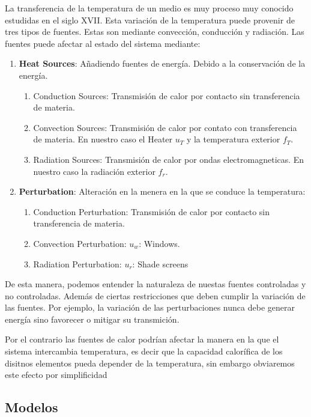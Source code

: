     La transferencia de la temperatura de un medio es muy proceso muy conocido estudidas en el siglo XVII. Esta variación de la temperatura puede provenir de tres tipos de fuentes. Estas son mediante convección, conducción y radiación. Las fuentes puede afectar al estado del sistema mediante:
    \begin{enumerate}
        \item \textbf{Heat Sources}: Añadiendo fuentes de energía. Debido a la conservación de la energía.
        \begin{enumerate}
            \item Conduction Sources: Transmisión de calor por contacto sin transferencia de materia.
            \item Convection Sources: Transmisión de calor por contato con transferencia de materia. En nuestro caso el Heater $u_T$ y la temperatura exterior $f_T$.
            \item Radiation Sources: Transmisión de calor por ondas electromagneticas. En nuestro caso la radiación exterior $f_r$.
        \end{enumerate}
        \item \textbf{Perturbation}: Alteración en la menera en la que se conduce la temperatura:
        \begin{enumerate}
            \item Conduction Perturbation: Transmisión de calor por contacto sin transferencia de materia.
            \item Convection Perturbation: $u_w$: Windows.
            \item Radiation Perturbation:  $u_r$:             Shade screens
        \end{enumerate}
    \end{enumerate}
    De esta manera, podemos entender la naturaleza de nuestas fuentes controladas y no controladas. Además de ciertas restricciones que deben cumplir la variación de las fuentes. Por ejemplo, la variación de las perturbaciones nunca debe generar energía sino favorecer o mitigar su transmición. 
    
    Por el contrario las fuentes de calor podrían afectar la manera en la que el sistema intercambia  temperatura, es decir que la capacidad calorífica de los disitnos elementos pueda depender de la temperatura, sin embargo obviaremos este efecto por simplificidad
    
    \subsection{Modelos }
    
